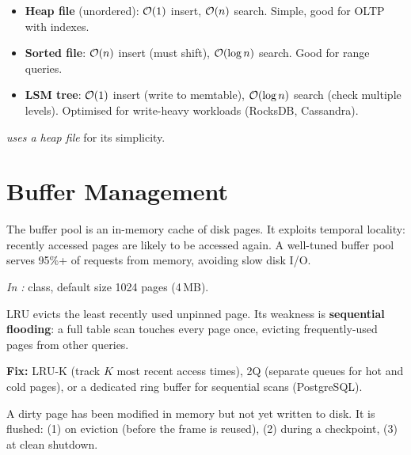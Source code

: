\begin{interviewbox}
\begin{itemize}[nosep]
  \item \textbf{Heap file} (unordered): $\mathcal{O}(1)$ insert, $\mathcal{O}(n)$ search.  Simple, good for OLTP with indexes.
  \item \textbf{Sorted file}: $\mathcal{O}(n)$ insert (must shift), $\mathcal{O}(\log n)$ search.  Good for range queries.
  \item \textbf{LSM tree}: $\mathcal{O}(1)$ insert (write to memtable), $\mathcal{O}(\log n)$ search (check multiple levels).  Optimised for write-heavy workloads (RocksDB, Cassandra).
\end{itemize}
\emph{\shiftdb{} uses a heap file} for its simplicity.
\end{interviewbox}

\section{Buffer Management}

\begin{interviewbox}
The buffer pool is an in-memory cache of disk pages.  It exploits temporal locality: recently accessed pages are likely to be accessed again.  A well-tuned buffer pool serves 95\%+ of requests from memory, avoiding slow disk I/O.

\emph{In \shiftdb{}:}  class, default size 1024 pages (4\,MB).
\end{interviewbox}

\begin{interviewbox}
LRU evicts the least recently used unpinned page.  Its weakness is \textbf{sequential flooding}: a full table scan touches every page once, evicting frequently-used pages from other queries.

\textbf{Fix:} LRU-K (track $K$ most recent access times), 2Q (separate queues for hot and cold pages), or a dedicated ring buffer for sequential scans (PostgreSQL).
\end{interviewbox}

\begin{interviewbox}
A dirty page has been modified in memory but not yet written to disk.  It is flushed: (1) on eviction (before the frame is reused), (2) during a checkpoint, (3) at clean shutdown.
\end{interviewbox}

